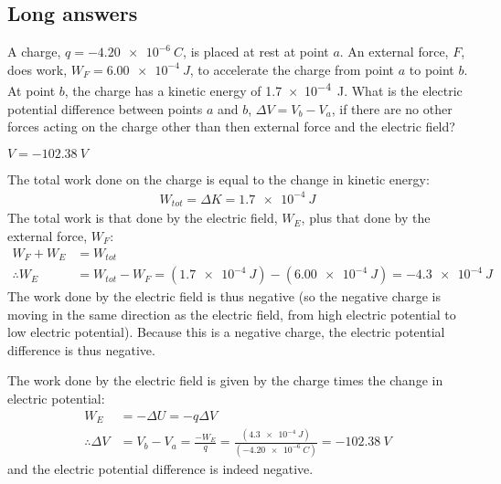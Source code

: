 \subsection{Long answers}
\question A charge, $q=\SI{-4.20e-6}{C}$, is placed at rest at point $a$. An external force, $F$, does work, $W_F=\SI{6.00e-4}{J}$, to accelerate the charge from point $a$ to point $b$. At point $b$, the charge has a kinetic energy of \SI{1.7e-4}{J}. What is the electric potential difference between points $a$ and $b$, $\Delta V=V_b-V_a$, if there are no other forces acting on the charge other than then external force and the electric field?
\begin{finalanswer}
$V=\SI{-102.38}{V}$
\end{finalanswer}
\begin{solution}
The total work done on the charge is equal to the change in kinetic energy:
\begin{align*}
W_{tot}=\Delta K=\SI{1.7e-4}{J}
\end{align*}
The total work is that done by the electric field, $W_E$, plus that done by the external force, $W_F$:
\begin{align*}
W_F+W_E&=W_{tot}\\
\therefore W_E&=W_{tot}-W_F=(\SI{1.7e-4}{J})-(\SI{6.00e-4}{J})=\SI{-4.3e-4}{J}
\end{align*}
The work done by the electric field is thus negative (so the negative charge is moving in the same direction as the electric field, from high electric potential to low electric potential). Because this is a negative charge, the electric potential difference is thus negative.

The work done by the electric field is given by the charge times the change in electric potential:
\begin{align*}
W_E&=-\Delta U=-q\Delta V\\
\therefore \Delta V&=V_b-V_a=\frac{-W_E}{q}=\frac{(\SI{4.3e-4}{J})}{(\SI{-4.20e-6}{C})}=\SI{-102.38}{V}
\end{align*}
and the electric potential difference is indeed negative.
\end{solution}

